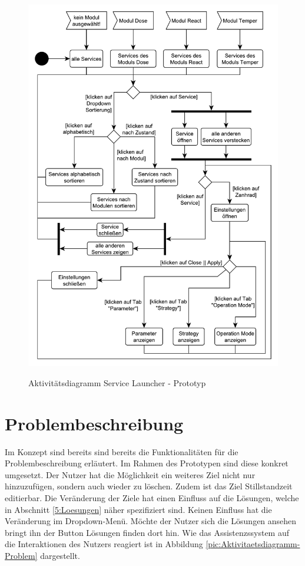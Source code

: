 \begin{figure}[htbp]
\centering
\includegraphics[scale=0.65]{DA_files/UML/Prototyp/Aktivitaetsdiagramm-ServiceLauchner.pdf}
\label{pic:Aktivitaetsdiagramm-ServiceLauncher}
\caption{Aktivitätsdiagramm Service Launcher - Prototyp}
\end{figure}

\section{Problembeschreibung}
\label{5:Problembeschreibung}
Im Konzept sind bereits sind bereits die Funktionalitäten für die Problembeschreibung erläutert. Im Rahmen des Prototypen sind diese konkret umgesetzt. Der Nutzer hat die Möglichkeit ein weiteres Ziel nicht nur hinzuzufügen, sondern auch wieder zu löschen. Zudem ist das Ziel Stillstandzeit editierbar. Die Veränderung der Ziele hat einen Einfluss auf die Lösungen, welche in Abschnitt \ref{5:Loesungen} näher spezifiziert sind. Keinen Einfluss hat die Veränderung im Dropdown-Menü. Möchte der Nutzer sich die Lösungen ansehen bringt ihn der Button Lösungen finden dort hin. Wie das Assistenzssystem auf die Interaktionen des Nutzers reagiert ist in Abbildung \ref{pic:Aktivitaetsdiagramm-Problem} dargestellt.

